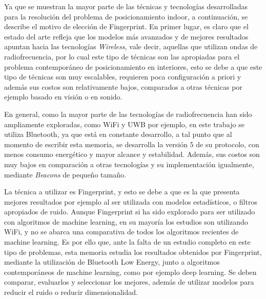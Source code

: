 \begin{enumerate}
\begin{itemize}
Ya que se muestran la mayor parte de las técnicas y tecnologías desarrolladas para la resolución del problema de posicionamiento indoor, a continuación, se describe el motivo de elección de Fingerprint. En primer lugar, es claro que el estado del arte refleja que los modelos más avanzados y de mejores resultados apuntan hacia las tecnologías \textit{Wireless}, vale decir, aquellas que utilizan ondas de radiofrecuencia, por lo cual este tipo de técnicas son las apropiadas para el problema contemporáneo de posicionamiento en interiores, esto se debe a que este tipo de técnicas son muy escalables, requieren poca configuración a priori y además sus costos son relativamente bajos, comparados a otras técnicas por ejemplo basado en visión o en sonido. 

En general, como la mayor parte de las tecnologías de radiofrecuencia han sido ampliamente exploradas, como WiFi y UWB por ejemplo, en este trabajo se utiliza Bluetooth, ya que está en constante desarrollo, a tal punto que al momento de escribir esta memoria, se desarrolla la versión 5 de su protocolo, con menos consumo energético y mayor alcance y estabilidad. Además, sus costos son muy bajos en comparación a otras tecnologías y su implementación igualmente, mediante \textit{Beacons} de pequeño tamaño. 

La técnica a utilizar es Fingerprint, y esto se debe a que es la que presenta mejores resultados por ejemplo al ser utilizada con modelos estadísticos, o filtros apropiados de ruido. Aunque Fingerprint si ha sido explorado para ser utilizado con algoritmos de machine learning, en su mayoría los estudios son utilizando WiFi, y no se abarca una comparativa de todos los algoritmos recientes de machine learning. Es por ello que, ante la falta de un estudio completo en este tipo de problemas, esta memoria estudia los resultados obtenidos por Fingerprint, mediante la utilización de Bluetooth Low Energy, junto a algoritmos contemporáneos de machine learning, como por ejemplo deep learning. Se deben comparar, evaluarlos y seleccionar los mejores, además de utilizar modelos para reducir el ruido o reducir dimensionalidad.


\end{itemize}
\end{enumerate}
